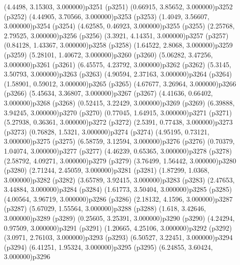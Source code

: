 \psPoint(4.4498, 3.15303, 3.000000){p3251}
\psdot(p3251)
\psPoint(0.66915, 3.85652, 3.000000){p3252}
\psdot(p3252)
\psPoint(4.44905, 3.70566, 3.000000){p3253}
\psdot(p3253)
\psPoint(1.4049, 3.56607, 3.000000){p3254}
\psdot(p3254)
\psPoint(4.62585, 0.46923, 3.000000){p3255}
\psdot(p3255)
\psPoint(2.25768, 2.79525, 3.000000){p3256}
\psdot(p3256)
\psPoint(3.3921, 4.14351, 3.000000){p3257}
\psdot(p3257)
\psPoint(0.84128, 1.43367, 3.000000){p3258}
\psdot(p3258)
\psPoint(1.64522, 2.8068, 3.000000){p3259}
\psdot(p3259)
\psPoint(5.28101, 1.40672, 3.000000){p3260}
\psdot(p3260)
\psPoint(5.06282, 3.47256, 3.000000){p3261}
\psdot(p3261)
\psPoint(6.45575, 4.23792, 3.000000){p3262}
\psdot(p3262)
\psPoint(5.3145, 3.50793, 3.000000){p3263}
\psdot(p3263)
\psPoint(4.90594, 2.37163, 3.000000){p3264}
\psdot(p3264)
\psPoint(1.58901, 0.59012, 3.000000){p3265}
\psdot(p3265)
\psPoint(4.67677, 3.26964, 3.000000){p3266}
\psdot(p3266)
\psPoint(5.45634, 3.36807, 3.000000){p3267}
\psdot(p3267)
\psPoint(4.41636, 0.66402, 3.000000){p3268}
\psdot(p3268)
\psPoint(0.52415, 3.22429, 3.000000){p3269}
\psdot(p3269)
\psPoint(6.39888, 3.94245, 3.000000){p3270}
\psdot(p3270)
\psPoint(0.77045, 1.64915, 3.000000){p3271}
\psdot(p3271)
\psPoint(5.27938, 0.36361, 3.000000){p3272}
\psdot(p3272)
\psPoint(2.5391, 0.77438, 3.000000){p3273}
\psdot(p3273)
\psPoint(0.76828, 1.5321, 3.000000){p3274}
\psdot(p3274)
\psPoint(4.95195, 0.73121, 3.000000){p3275}
\psdot(p3275)
\psPoint(6.58759, 3.12594, 3.000000){p3276}
\psdot(p3276)
\psPoint(0.70379, 1.04074, 3.000000){p3277}
\psdot(p3277)
\psPoint(4.46239, 0.65365, 3.000000){p3278}
\psdot(p3278)
\psPoint(2.58792, 4.09271, 3.000000){p3279}
\psdot(p3279)
\psPoint(3.76499, 1.56442, 3.000000){p3280}
\psdot(p3280)
\psPoint(2.71244, 2.45059, 3.000000){p3281}
\psdot(p3281)
\psPoint(1.87299, 1.0368, 3.000000){p3282}
\psdot(p3282)
\psPoint(3.65789, 3.92415, 3.000000){p3283}
\psdot(p3283)
\psPoint(2.47653, 3.44884, 3.000000){p3284}
\psdot(p3284)
\psPoint(1.61773, 3.50404, 3.000000){p3285}
\psdot(p3285)
\psPoint(4.00564, 3.96719, 3.000000){p3286}
\psdot(p3286)
\psPoint(2.18132, 4.1596, 3.000000){p3287}
\psdot(p3287)
\psPoint(5.67029, 1.55564, 3.000000){p3288}
\psdot(p3288)
\psPoint(1.618, 3.42646, 3.000000){p3289}
\psdot(p3289)
\psPoint(0.25605, 3.25391, 3.000000){p3290}
\psdot(p3290)
\psPoint(4.24294, 0.97509, 3.000000){p3291}
\psdot(p3291)
\psPoint(1.20665, 4.25106, 3.000000){p3292}
\psdot(p3292)
\psPoint(3.0971, 2.76103, 3.000000){p3293}
\psdot(p3293)
\psPoint(6.50527, 3.22451, 3.000000){p3294}
\psdot(p3294)
\psPoint(6.41251, 1.95324, 3.000000){p3295}
\psdot(p3295)
\psPoint(6.24855, 3.60424, 3.000000){p3296}
